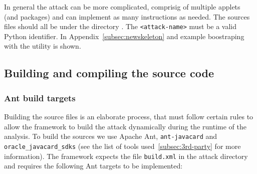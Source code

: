             In general the attack can be more complicated, comprisig of multiple applets (and packages) and can implement as many instructions as needed. The sources files should all be under the directory . The \texttt{<attack-name>} must be a valid Python identifier\footnotemark.
            In Appendix~\ref{subsec:newskeleton} and example boostraping with the utility \javusdev is shown.


    \subsection{Building and compiling the source code}\label{subsec:build:compile}

            \subsubsection{Ant build targets}\label{subsubsec:ant-targets}
            Building the source files is an elaborate process, that must follow certain rules to allow the framework to build the attack dynamically during the runtime of the analysis. To build the sources we use Apache Ant, \texttt{ant-javacard} and \texttt{oracle_javacard_sdks} (see the list of tools used~\ref{subsec:3rd-party} for more information). The framework expects the file \texttt{build.xml} in the attack directory and requires the following Ant targets to be implemented:

